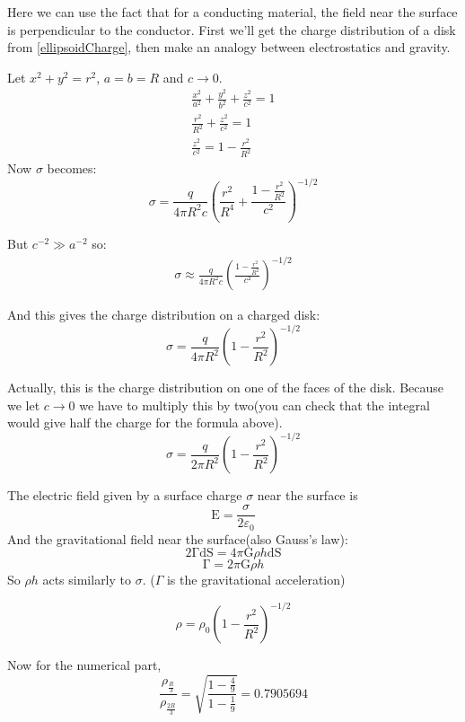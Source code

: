 \begin{solution}

Here we can use the fact that for a conducting material, the field near 
the surface is perpendicular to the conductor. First we'll get the charge 
distribution of a disk from \eqref{ellipsoidCharge}, then make an analogy 
between electrostatics and gravity.

Let $x^2+y^2 = r^2$, $a=b=R$ and $c\rightarrow 0$.
\begin{gather*}
    \frac{x^2}{a^2} + \frac{y^2}{b^2} + \frac{z^2}{c^2} = 1\\
    \frac{r^2}{R^2}+\frac{z^2}{c^2}=1\\
    \frac{z^2}{c^2} = 1 - \frac{r^2}{R^2} 
\end{gather*}
Now $\sigma$ becomes:
\begin{equation*}
    \sigma = \frac{q}{4\pi R^2c} {\left( \frac{r^2}{R^4}
    + \frac{1 - \frac{r^2}{R^2}}{c^2} \right)} ^ {-1 / 2}
\end{equation*}

But $c^{-2} \gg a^{-2}$ so:
\begin{gather*}
    \sigma \approx \frac{q}{4\pi R^2c} {\left(\frac{1 - \frac{r^2}{R^2}}{c^2}
    \right)} ^ {-1 / 2} 
\end{gather*}

And this gives the charge distribution on a charged disk:
\begin{equation*}
    \sigma = \frac{q}{4\pi R^2} {\left(1 - \frac{r^2}{R^2}
    \right)} ^ {-1 / 2} 
\end{equation*}

Actually, this is the charge distribution on one of the faces of the disk.
Because we let $c \rightarrow 0$ we have to multiply this by two(you can 
check that the integral would give half the charge for the formula above).
\begin{equation*}
    \sigma = \frac{q}{2\pi R^2} {\left(1 - \frac{r^2}{R^2}
    \right)} ^ {-1 / 2} 
\end{equation*}

The electric field given by a surface charge $\sigma$ near the surface is 
\[ \mathrm{E} = \frac{\sigma}{2\varepsilon_0} \]
And the gravitational field near the surface(also Gauss's law):
\[ 2 \mathrm{\Gamma} \mathrm{dS}= 4 \pi \mathrm{G} \rho h \mathrm{dS}\]
\[ \mathrm{\Gamma} = 2 \pi \mathrm{G} \rho h\]
So $\rho h$ acts similarly to $\sigma$. ($\Gamma$ is the gravitational 
acceleration)

\begin{equation}
    \rho = \rho_0 {\left(1 - \frac{r^2}{R^2} \right)} ^ {-1 / 2} 
    \label{densityDistribution}
\end{equation}

Now for the numerical part,
\begin{equation*}
    \frac{\rho_{\frac{R}{3}}}{\rho_{\frac{2R}{3}}} =
    \sqrt{\frac{1 - \frac{4}{9}}{1 - \frac{1}{9}}} = 0.7905694
\end{equation*}

\end{solution}